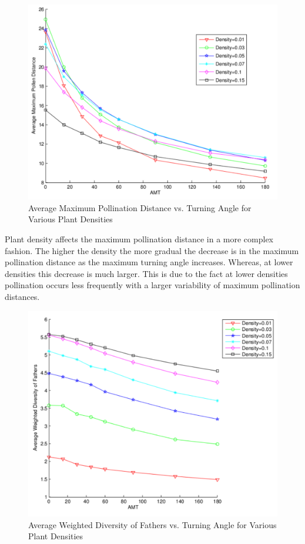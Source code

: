 \begin{figure}
  \begin{center}
  \includegraphics[scale=0.5]{Figures/MaxPollenVsAMT.pdf}
  \end{center}
  \caption{\small Average Maximum Pollination Distance vs. Turning Angle for Various Plant Densities}
  \label{AvgMaxDTreesN}
\end{figure}

Plant density affects the maximum pollination distance in a more complex
fashion.  The higher the density the more gradual the decrease is in the maximum
pollination distance as the maximum turning angle increases.  Whereas, at lower
densities this decrease is much larger.  This is due to the fact at lower
densities pollination occurs less frequently with a larger variability of
maximum pollination distances.

\begin{figure}
  \begin{center}
  \includegraphics[scale=0.5]{Figures/WDFvsAMT.pdf}
  \end{center}
  \caption{\small Average Weighted Diversity of Fathers vs. Turning Angle for Various Plant Densities}
  \label{EFathers}
\end{figure}

